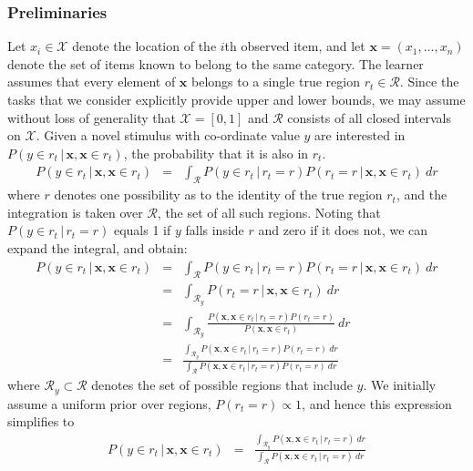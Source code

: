 \documentclass[doc]{apa6}
\newcommand{\p}{P}
\newcommand{\xn}{{\bm{x}}}
\newcommand{\rt}{{r_t}}
\newcommand{\condon}{\, | \,}
\begin{document}
\subsubsection{Preliminaries} Let $x_i \in \mathcal{X}$ denote the location of the $i$th observed item, and let $\xn=(x_1, \ldots, x_n)$ denote the set of items known to belong to the same category. The learner assumes that every element of $\xn$ belongs to a single true region $\rt \in \mathcal{R}$. Since the tasks that we consider explicitly provide upper and lower bounds, we may assume without loss of generality that $\mathcal{X}=[0,1]$ and $\mathcal{R}$ consists of all closed intervals on $\mathcal{X}$. Given a novel stimulus with co-ordinate value $y$ are interested in $\p(y\in \rt \condon  \xn, \xn \in \rt)$, the probability that it is also in $\rt$.
\begin{eqnarray}
\p(y \in \rt \condon  \xn, \xn \in \rt) &=& \int_{\mathcal{R}} \p(y \in \rt \condon  \rt = r) \p(\rt = r \condon  \xn, \xn \in \rt) \ dr
\end{eqnarray}
where $r$ denotes one possibility as to the identity of the true region $\rt$, and the integration is taken over $\mathcal{R}$, the set of all such regions. Noting that $\p(y \in \rt \condon  \rt = r)$ equals 1 if $y$ falls inside $r$ and zero if it does not, we can expand the integral, and obtain:
\begin{eqnarray}
\p(y \in \rt \condon  \xn, \xn \in \rt) &=& \int_{\mathcal{R}} \p(y \in \rt \condon  \rt = r) \p(\rt = r \condon  \xn, \xn \in \rt) \ dr \nonumber \\
&=& \int_{\mathcal{R}_y}  \p(\rt = r \condon  \xn, \xn \in \rt) \ dr \nonumber \\
&=& \int_{\mathcal{R}_y} \frac{\p(\xn, \xn \in \rt \condon  \rt = r) \p(\rt=r)}{\p(\xn, \xn \in \rt)}  \ dr \nonumber \\
&=& \frac{\int_{\mathcal{R}_y} \p(\xn, \xn \in \rt\condon  \rt =r ) \p(\rt=r) \ dr}{\int_{\mathcal{R}}\p(\xn, \xn \in \rt \condon  \rt=r) \p(\rt=r) \ dr}
\end{eqnarray}
where $\mathcal{R}_y \subset \mathcal{R}$ denotes the set of possible regions that include $y$.
We initially assume a uniform prior over regions, $\p(\rt=r) \propto 1$, and hence this expression simplifies to
\begin{eqnarray}
\p(y \in \rt \condon  \xn, \xn \in \rt)
&=& \frac{\int_{\mathcal{R}_y} \p(\xn, \xn \in \rt\condon  \rt=r)  \ dr}{\int_{\mathcal{R}}\p(\xn, \xn \in \rt \condon  \rt=r) \ dr}  \label{genexp}
\end{eqnarray}
\end{document}
